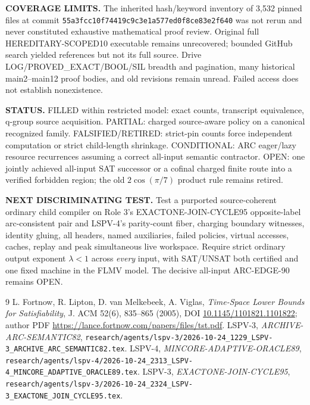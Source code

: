 \documentclass[11pt]{article}
\begin{document}
\textbf{COVERAGE LIMITS.} The inherited hash/keyword inventory of 3,532 pinned files at commit \texttt{55a3fcc10f74419c9c3e1a577ed0f8ce83e2f640} was not rerun and never constituted exhaustive mathematical proof review. Original full HEREDITARY-SCOPED10 executable remains unrecovered; bounded GitHub search yielded references but not its full source. Drive LOG/PROVED\_EXACT/BOOL/SIL breadth and pagination, many historical main2--main12 proof bodies, and old revisions remain unread. Failed access does not establish nonexistence.

\textbf{STATUS.} FILLED within restricted model: exact counts, transcript equivalence, q-group source acquisition. PARTIAL: charged source-aware policy on a canonical recognized family. FALSIFIED/RETIRED: strict-pin counts force independent computation or strict child-length shrinkage. CONDITIONAL: ARC eager/lazy resource recurrences assuming a correct all-input semantic contractor. OPEN: one jointly achieved all-input SAT successor or a cofinal charged finite route into a verified forbidden region; the old $2\cos(\pi/7)$ product rule remains retired.

\textbf{NEXT DISCRIMINATING TEST.} Test a purported source-coherent ordinary child compiler on Role 3's EXACTONE-JOIN-CYCLE95 opposite-label arc-consistent pair and LSPV-4's parity-count fiber, charging boundary witnesses, identity gluing, all headers, named auxiliaries, failed policies, virtual accesses, caches, replay and peak simultaneous live workspace. Require strict ordinary output exponent $\lambda<1$ across \emph{every} input, with SAT/UNSAT both certified and one fixed machine in the FLMV model. The decisive all-input ARC-EDGE-90 remains OPEN.

\begin{thebibliography}{9}
 L. Fortnow, R. Lipton, D. van Melkebeek, A. Viglas,
\emph{Time-Space Lower Bounds for Satisfiability}, J. ACM 52(6), 835--865 (2005), DOI \href{https://doi.org/10.1145/1101821.1101822}{10.1145/1101821.1101822}; author PDF \url{https://lance.fortnow.com/papers/files/tst.pdf}.
 LSPV-3, \emph{ARCHIVE-ARC-SEMANTIC82}, \texttt{research/agents/lspv-3/2026-10-24\_1229\_LSPV-3\_ARCHIVE\_ARC\_SEMANTIC82.tex}.
 LSPV-4, \emph{MINCORE-ADAPTIVE-ORACLE89}, \texttt{research/agents/lspv-4/2026-10-24\_2313\_LSPV-4\_MINCORE\_ADAPTIVE\_ORACLE89.tex}.
 LSPV-3, \emph{EXACTONE-JOIN-CYCLE95}, \texttt{research/agents/lspv-3/2026-10-24\_2324\_LSPV-3\_EXACTONE\_JOIN\_CYCLE95.tex}.
\end{thebibliography}
\end{document}
